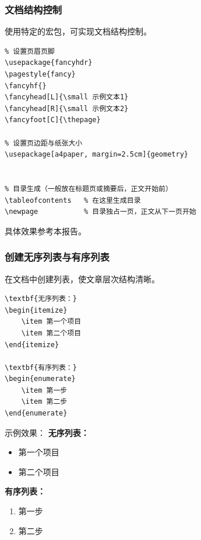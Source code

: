 \subsubsection{文档结构控制}
使用特定的宏包，可实现文档结构控制。
\begin{verbatim}
% 设置页眉页脚
\usepackage{fancyhdr}
\pagestyle{fancy}
\fancyhf{}
\fancyhead[L]{\small 示例文本1}
\fancyhead[R]{\small 示例文本2}
\fancyfoot[C]{\thepage}

% 设置页边距与纸张大小
\usepackage[a4paper, margin=2.5cm]{geometry}


% 目录生成（一般放在标题页或摘要后，正文开始前）
\tableofcontents   % 在这里生成目录
\newpage           % 目录独占一页，正文从下一页开始
\end{verbatim}

具体效果参考本报告。

\subsubsection{创建无序列表与有序列表}

在文档中创建列表，使文章层次结构清晰。
\begin{verbatim}
\textbf{无序列表：}
\begin{itemize}
    \item 第一个项目
    \item 第二个项目
\end{itemize}

\textbf{有序列表：}
\begin{enumerate}
    \item 第一步
    \item 第二步
\end{enumerate}
\end{verbatim}

示例效果：
\textbf{无序列表：}
\begin{itemize}
    \item 第一个项目
    \item 第二个项目
\end{itemize}

\textbf{有序列表：}
\begin{enumerate}
    \item 第一步
    \item 第二步
\end{enumerate}

